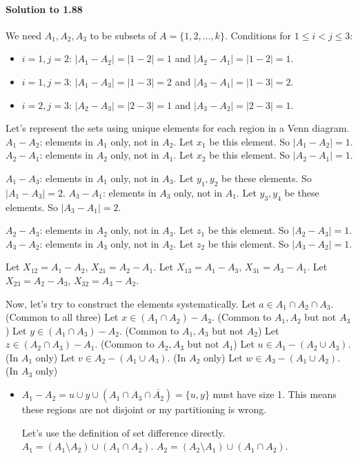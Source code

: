 \documentclass{article}
\begin{document}
\begin{itemize}
\begin{itemize}
\paragraph*{Solution to 1.88}
We need $A_1, A_2, A_3$ to be subsets of $A = \{1, 2, \dots, k\}$.
Conditions for $1 \le i < j \le 3$:
\begin{itemize}
    \item $i=1, j=2$: $|A_1 - A_2| = |1-2| = 1$ and $|A_2 - A_1| = |1-2| = 1$.
    \item $i=1, j=3$: $|A_1 - A_3| = |1-3| = 2$ and $|A_3 - A_1| = |1-3| = 2$.
    \item $i=2, j=3$: $|A_2 - A_3| = |2-3| = 1$ and $|A_3 - A_2| = |2-3| = 1$.
\end{itemize}
Let's represent the sets using unique elements for each region in a Venn diagram.
$A_1 - A_2$: elements in $A_1$ only, not in $A_2$. Let $x_1$ be this element. So $|A_1 - A_2| = 1$.
$A_2 - A_1$: elements in $A_2$ only, not in $A_1$. Let $x_2$ be this element. So $|A_2 - A_1| = 1$.

$A_1 - A_3$: elements in $A_1$ only, not in $A_3$. Let $y_1, y_2$ be these elements. So $|A_1 - A_3| = 2$.
$A_3 - A_1$: elements in $A_3$ only, not in $A_1$. Let $y_3, y_4$ be these elements. So $|A_3 - A_1| = 2$.

$A_2 - A_3$: elements in $A_2$ only, not in $A_3$. Let $z_1$ be this element. So $|A_2 - A_3| = 1$.
$A_3 - A_2$: elements in $A_3$ only, not in $A_2$. Let $z_2$ be this element. So $|A_3 - A_2| = 1$.

Let $X_{12} = A_1 - A_2$, $X_{21} = A_2 - A_1$.
Let $X_{13} = A_1 - A_3$, $X_{31} = A_3 - A_1$.
Let $X_{23} = A_2 - A_3$, $X_{32} = A_3 - A_2$.

Now, let's try to construct the elements systematically.
Let $a \in A_1 \cap A_2 \cap A_3$. (Common to all three)
Let $x \in (A_1 \cap A_2) - A_3$. (Common to $A_1, A_2$ but not $A_3$)
Let $y \in (A_1 \cap A_3) - A_2$. (Common to $A_1, A_3$ but not $A_2$)
Let $z \in (A_2 \cap A_3) - A_1$. (Common to $A_2, A_3$ but not $A_1$)
Let $u \in A_1 - (A_2 \cup A_3)$. (In $A_1$ only)
Let $v \in A_2 - (A_1 \cup A_3)$. (In $A_2$ only)
Let $w \in A_3 - (A_1 \cup A_2)$. (In $A_3$ only)

\begin{itemize}
    \item $A_1 - A_2 = u \cup y \cup (A_1 \cap A_3 \cap \overline{A_2}) = \{u, y\}$ must have size 1. This means these regions are not disjoint or my partitioning is wrong.

Let's use the definition of set difference directly.
$A_1 = (A_1 \setminus A_2) \cup (A_1 \cap A_2)$.
$A_2 = (A_2 \setminus A_1) \cup (A_1 \cap A_2)$.


\end{itemize}
\end{itemize}
\end{itemize}
\end{document}
